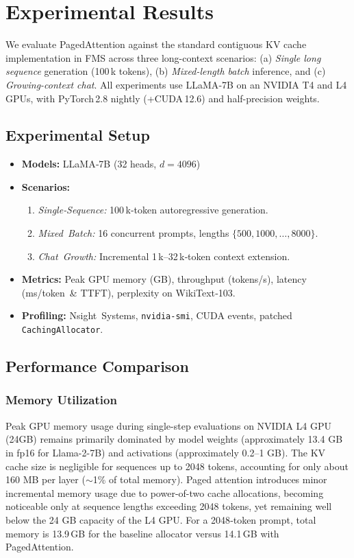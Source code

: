 \documentclass[conference]{IEEEtran}
\begin{document}
\section{Experimental Results}\label{sec:results}

We evaluate PagedAttention against the standard contiguous KV cache implementation in FMS across three long-context scenarios:  
(a) \emph{Single long sequence} generation (100 k tokens),  
(b) \emph{Mixed-length batch} inference, and  
(c) \emph{Growing-context chat}.  
All experiments use LLaMA‐7B on an NVIDIA T4 and L4 GPUs, with PyTorch 2.8 nightly (+CUDA 12.6) and half-precision weights.  

\subsection{Experimental Setup}\label{ssec:setup}
\begin{itemize}[leftmargin=*,labelsep=0.5em]
  \raggedright
  \item \textbf{Models:} LLaMA‑7B (32 heads, $d = 4096$)
  \item \textbf{Scenarios:}
    \begin{enumerate}
      \item \emph{Single‑Sequence:} 100 k‑token autoregressive generation.
      \item \emph{Mixed Batch:} 16 concurrent prompts, lengths $\{500,1000,\dots,8000\}$.
      \item \emph{Chat Growth:} Incremental 1 k–32 k‑token context extension.
    \end{enumerate}
  \item \textbf{Metrics:} Peak GPU memory (GB), throughput (tokens/s), latency (ms/token \& TTFT), perplexity on WikiText‑103.
  \item \textbf{Profiling:} Nsight Systems, \texttt{nvidia‑smi}, CUDA events, patched \texttt{CachingAllocator}.
\end{itemize}

\subsection{Performance Comparison}\label{ssec:comparison}

\subsubsection{Memory Utilization}
Peak GPU memory usage during single-step evaluations on NVIDIA L4 GPU (24GB) remains primarily dominated by model weights (approximately 13.4 GB in fp16 for Llama-2-7B) and activations (approximately 0.2–1 GB). The KV cache size is negligible for sequences up to 2048 tokens, accounting for only about 160 MB per layer ($\sim$1\% of total memory). Paged attention introduces minor incremental memory usage due to power-of-two cache allocations, becoming noticeable only at sequence lengths exceeding 2048 tokens, yet remaining well below the 24 GB capacity of the L4 GPU. For a 2048‑token prompt, total memory is 13.9 GB for the baseline allocator versus 14.1 GB with PagedAttention.
\end{document}
